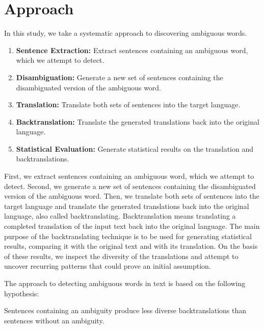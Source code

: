 \section{Approach}
\label{sec:Methodology:Approach}


In this study, we take a systematic approach to discovering ambiguous words. 

\begin{enumerate}
  \item \textbf{Sentence Extraction:} Extract sentences containing an ambiguous word, which we attempt to detect.
  \item \textbf{Disambiguation:} Generate a new set of sentences containing the disambiguated version of the ambiguous word.
  \item \textbf{Translation:} Translate both sets of sentences into the target language.
  \item \textbf{Backtranslation:} Translate the generated translations back into the original language.
  \item \textbf{Statistical Evaluation:} Generate statistical results on the translation and backtranslations.
\end{enumerate}

First, we extract sentences containing an ambiguous word, which we attempt to detect. Second, we generate a new set of sentences containing the disambiguated version of the ambiguous word. Then, we translate both sets of sentences into the target language and translate the generated translations back into the original language, also called backtranslating.
Backtranslation means translating a completed translation of the input text back into the original language. The main purpose of the backtranslating technique is to be used for generating statistical results, comparing it with the original text and with its translation. On the basis of these results, we inspect the diversity of the translations and attempt to uncover recurring patterns that could prove an initial assumption.

The approach to detecting ambiguous words in text is based on the following hypothesis:

\begin{hyp}\label{main}
Sentences containing an ambiguity produce less diverse backtranslations than sentences without an ambiguity.
\end{hyp}


